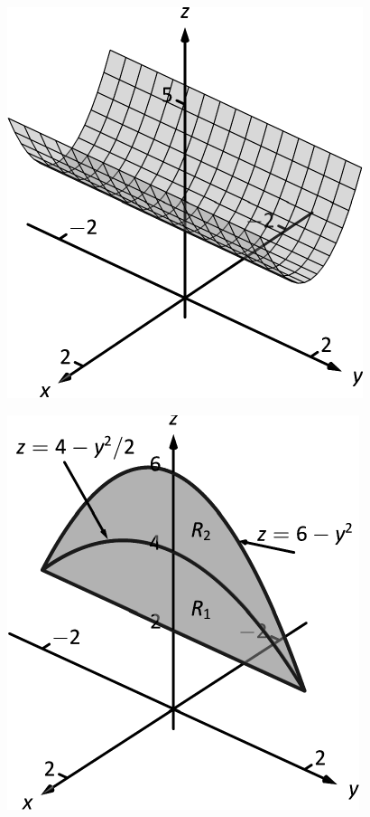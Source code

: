 \documentclass[10pt]{article}
\begin{document}
\includegraphics{figtrip5c_3DBW.pdf}
\texttt{}

\includegraphics{figtrip5d_3DBW.pdf}
\texttt{}
\end{document}
